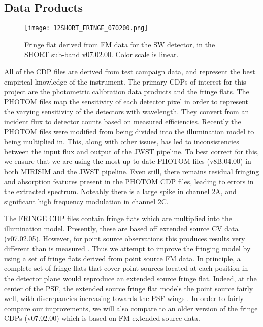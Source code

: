 \subsection{Data Products}
\begin{wrapfigure}{r}{5.5cm}
	\texttt{[image: 12SHORT\_FRINGE\_070200.png]}
	\caption{Fringe flat derived from FM data for the SW detector, in the SHORT sub-band v07.02.00. Color scale is linear.}
	\label{fig:fringeflat}
\end{wrapfigure}
All of the CDP files are derived from test campaign data, and represent the best empirical knowledge of the instrument.
The primary CDPs of interest for this project are the photometric calibration data products and the fringe flats.
The PHOTOM files map the sensitivity of each detector pixel in order to represent the varying sensitivity of the detectors with wavelength. 
They convert from an incident flux to detector counts based on measured efficiencies.
Recently the PHOTOM files were modified from being divided into the illumination model to being multiplied in. 
This, along with other issues, has led to inconsistencies between the input flux and output of the JWST pipeline.
To best correct for this, we ensure that we are using the most up-to-date PHOTOM files (v8B.04.00) in both MIRISIM and the JWST pipeline.
Even still, there remains residual fringing and absorption features present in the PHOTOM CDP files, leading to errors in the extracted spectrum.
Noteably there is a large spike in channel 2A, and significant high frequency modulation in channel 2C.

The FRINGE CDP files contain fringe flats which are multiplied into the illumination model. 
Presently, these are based off extended source CV data (v07.02.05).
However, for point source observations this produces results very different than is measured \parencite{Argyriou2018a}.
Thus we attempt to improve the fringing model by using a set of fringe flats derived from point source FM data. 
In principle, a complete set of fringe flats that cover point sources located at each position in the detector plane would reproduce an extended source fringe flat.
Indeed, at the center of the PSF, the extended source fringe flat models the point source fairly well, with discrepancies increasing towards the PSF wings \parencite{Argyriou2020}.
In order to fairly compare our improvements, we will also compare to an older version of the fringe CDPs (v07.02.00) which is based on FM extended source data.


